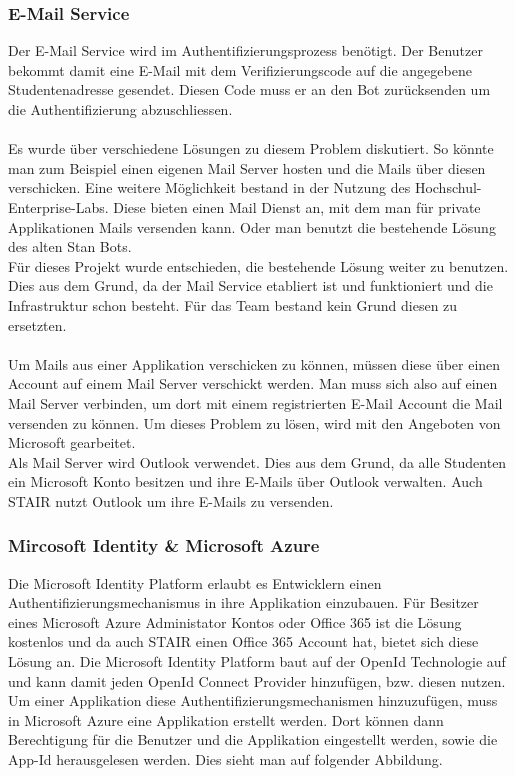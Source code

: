 \documentclass[a4paper, table]{article}
\begin{document}
\subsubsection{E-Mail Service}
Der E-Mail Service wird im Authentifizierungsprozess benötigt.
Der Benutzer bekommt damit eine E-Mail mit dem Verifizierungscode auf die angegebene Studentenadresse gesendet.
Diesen Code muss er an den Bot zurücksenden um die Authentifizierung abzuschliessen.\\\\
Es wurde über verschiedene Lösungen zu diesem Problem diskutiert.
So könnte man zum Beispiel einen eigenen Mail Server hosten und die Mails über diesen verschicken.
Eine weitere Möglichkeit bestand in der Nutzung des Hochschul-Enterprise-Labs.
Diese bieten einen Mail Dienst an, mit dem man für private Applikationen Mails versenden kann.
Oder man benutzt die bestehende Lösung des alten Stan Bots.\\
Für dieses Projekt wurde entschieden, die bestehende Lösung weiter zu benutzen.
Dies aus dem Grund, da der Mail Service etabliert ist und funktioniert und die Infrastruktur schon besteht.
Für das Team bestand kein Grund diesen zu ersetzten.\\\\
Um Mails aus einer Applikation verschicken zu können, müssen diese über einen Account auf einem Mail Server verschickt werden.
Man muss sich also auf einen Mail Server verbinden, um dort mit einem registrierten E-Mail Account die Mail versenden zu können.
Um dieses Problem zu lösen, wird mit den Angeboten von Microsoft gearbeitet.\\
Als Mail Server wird Outlook verwendet.
Dies aus dem Grund, da alle Studenten ein Microsoft Konto besitzen und ihre E-Mails über Outlook verwalten.
Auch STAIR nutzt Outlook um ihre E-Mails zu versenden.

\subsubsection*{Mircosoft Identity \& Microsoft Azure}
Die Microsoft Identity Platform erlaubt es Entwicklern einen Authentifizierungsmechanismus in ihre Applikation einzubauen.
Für Besitzer eines Microsoft Azure Administator Kontos oder Office 365 ist die Lösung kostenlos und da auch STAIR einen Office 365 Account hat,
bietet sich diese Lösung an.
Die Microsoft Identity Platform baut auf der OpenId Technologie auf und kann damit jeden OpenId Connect Provider hinzufügen, bzw. diesen nutzen.
Um einer Applikation diese Authentifizierungsmechanismen hinzuzufügen, muss in Microsoft Azure eine Applikation erstellt werden.
Dort können dann Berechtigung für die Benutzer und die Applikation eingestellt werden, sowie die App-Id herausgelesen werden. \autocite{}
Dies sieht man auf folgender Abbildung.
\end{document}
